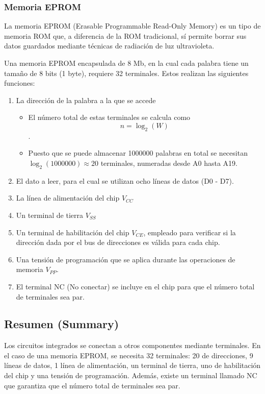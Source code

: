 \documentclass{article}
\begin{document}
\subsubsection{Memoria EPROM}
\label{sec:org1aeb2be}
La memoria EPROM (Erasable Programmable Read-Only Memory) es un tipo
de memoria ROM que, a diferencia de la ROM tradicional, sí permite
borrar sus datos guardados mediante técnicas de radiación de luz
ultravioleta. 

Una memoria EPROM encapsulada de 8 Mb, en la cual cada palabra tiene
un tamaño de 8 bits (1 byte), requiere 32 terminales. Estos
realizan las siguientes funciones:
\begin{enumerate}
\item La dirección de la palabra a la que se accede
\begin{itemize}
\item El número total de estas terminales se calcula como
\[
     n=\log_{2}(W)
     \].
\item Puesto que se puede almacenar 1000000 palabras en total se necesitan
\(\log_2(1000000) \approx 20\) terminales, numeradas desde A0 hasta A19.
\end{itemize}
\item El dato a leer, para el cual se utilizan ocho líneas de datos (D0 - D7).
\item La línea de alimentación del chip \(V_{CC}\)
\item Un terminal de tierra \(V_{SS}\)
\item Un terminal de habilitación del chip \(V_{CE}\), empleado para verificar si la
dirección dada por el bus de direcciones es válida para cada chip.
\item Una tensión de programación que se aplica durante las operaciones
de memoria \(V_{PP}\).
\item El terminal NC (No conectar) se incluye en el chip para que el
número total de terminales sea par.
\end{enumerate}

\subsection{Resumen (Summary)}
\label{sec:org6e2b1ac}
Los circuitos integrados se conectan a otros componentes mediante
terminales. En el caso de una memoria EPROM, se necesita 32
terminales: 20 de direcciones, 9 líneas de datos, 1 línea de
alimentación, un terminal de tierra, uno de habilitación del chip y
una tensión de programación. Además, existe un terminal llamado NC que
garantiza que el número total de terminales sea par.
\end{document}
